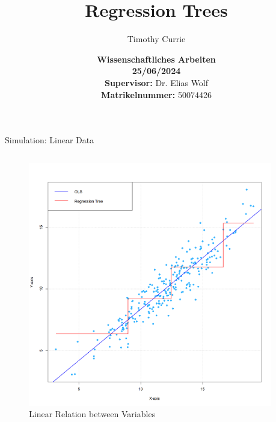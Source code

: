 \documentclass[10pt]{beamer}
\title{Regression Trees}
\author{Timothy Currie}
\institute{Universität Bonn}
\date{\vspace{2cm} \textbf{\large{Wissenschaftliches Arbeiten}} \\ \textbf{25/06/2024} \\ 
       \vspace{1cm} \textbf{Supervisor:} Dr. Elias Wolf \\ 
       \textbf{Matrikelnummer:} 50074426}
\begin{document}
\maketitle













\begin{frame}{Simulation: Linear Data}
    \begin{columns}[T]
        \begin{column}{0.5\textwidth}
        \begin{figure}
            \centering
            \includegraphics[width=1\linewidth]{OLS vs Tree.png}
            \caption{Linear Relation between Variables}
            \label{fig:sub4}  %
            \end{figure}
        \end{column}
        \begin{column}{0.5\textwidth}
        
            \begin{itemize}
                        \vspace{0.7cm}


\end{itemize}
\end{column}
\end{columns}
\end{frame}
\end{document}
